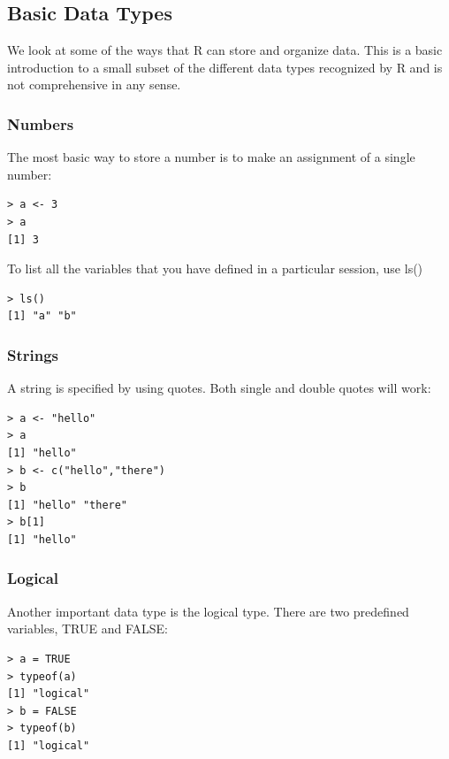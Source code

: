 \subsection{Basic Data Types}

We look at some of the ways that R can store and organize data. This is a basic introduction to a small subset of the different data types recognized by R and is not comprehensive in any sense.

\subsubsection{Numbers}

 The most basic way to store a number is to make an assignment of a single number: \newline
 
\begin{lstlisting}[frame=single]
> a <- 3
> a
[1] 3
\end{lstlisting}

To list all  the variables that you have defined in a particular session, use ls() \newline

\begin{lstlisting}[frame=single]
> ls()
[1] "a" "b"
\end{lstlisting}

\subsubsection{Strings}

 A string is specified by using quotes. Both single and double quotes will work: \newline

\begin{lstlisting}[frame=single]
> a <- "hello"
> a
[1] "hello"
> b <- c("hello","there")
> b
[1] "hello" "there"
> b[1]
[1] "hello"
\end{lstlisting}

\subsubsection{Logical}

Another important data type is the logical type. There are two predefined variables, TRUE and FALSE: \newline

\begin{lstlisting}[frame=single]
> a = TRUE
> typeof(a)
[1] "logical"
> b = FALSE
> typeof(b)
[1] "logical"
\end{lstlisting}

